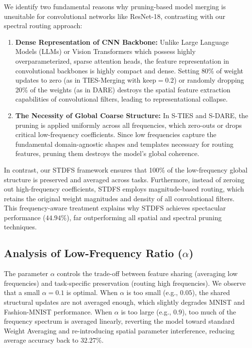 \documentclass{article}
\theoremstyle{plain}
\theoremstyle{definition}
\theoremstyle{remark}
\begin{document}
We identify two fundamental reasons why pruning-based model merging is unsuitable for convolutional networks like ResNet-18, contrasting with our spectral routing approach:
\begin{enumerate}\itemsep=1pt \topsep=1pt \parsep=0pt
    \item \textbf{Dense Representation of CNN Backbone:} Unlike Large Language Models (LLMs) or Vision Transformers which possess highly overparameterized, sparse attention heads, the feature representation in convolutional backbones is highly compact and dense. Setting 80\% of weight updates to zero (as in TIES-Merging with $\text{keep}=0.2$) or randomly dropping 20\% of the weights (as in DARE) destroys the spatial feature extraction capabilities of convolutional filters, leading to representational collapse.
    \item \textbf{The Necessity of Global Coarse Structure:} In S-TIES and S-DARE, the pruning is applied uniformly across all frequencies, which zero-outs or drops critical low-frequency coefficients. Since low frequencies capture the fundamental domain-agnostic shapes and templates necessary for routing features, pruning them destroys the model's global coherence.
\end{enumerate}
In contrast, our STDFS framework ensures that 100\% of the low-frequency global structure is preserved and averaged across tasks. Furthermore, instead of zeroing out high-frequency coefficients, STDFS employs magnitude-based routing, which retains the original weight magnitudes and density of all convolutional filters. This frequency-aware treatment explains why STDFS achieves spectacular performance ($44.94\%$), far outperforming all spatial and spectral pruning techniques.

\subsection{Analysis of Low-Frequency Ratio ($\alpha$)}
The parameter $\alpha$ controls the trade-off between feature sharing (averaging low frequencies) and task-specific preservation (routing high frequencies). We observe that a small $\alpha = 0.1$ is optimal. When $\alpha$ is too small (e.g., $0.05$), the shared structural updates are not averaged enough, which slightly degrades MNIST and Fashion-MNIST performance. When $\alpha$ is too large (e.g., $0.9$), too much of the frequency spectrum is averaged linearly, reverting the model toward standard Weight Averaging and re-introducing spatial parameter interference, reducing average accuracy back to $32.27\%$.
\end{document}
